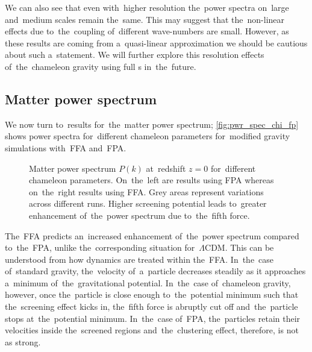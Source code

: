 We can also see that even with~higher resolution the~power spectra on~large and~medium scales remain the~same. This may suggest that the~non-linear effects due to~the~coupling of~different wave-numbers are small. However, as these results are coming from a~quasi-linear approximation we should be cautious about such a~statement. We will further explore this resolution effects of~the~chameleon gravity using full \nbodysim s in~the~future.
\subsection{Matter power spectrum}
We now turn to~results for~the~matter power spectrum; \autoref{fig:pwr_spec_chi_fp} shows power spectra for~different chameleon parameters for~modified gravity simulations with~FFA and~FPA.
\begin{figure}[bt]
	\begin{adjustwidth}{-1cm}{-1cm}
	\centering
		\begin{subfigure}{1.2\textwidth}
		\end{subfigure}
		\begin{subfigure}{0.5\textwidth}
		\end{subfigure}
		\begin{subfigure}{0.5\textwidth}
		\end{subfigure}
		\begin{subfigure}{0.5\textwidth}
		\end{subfigure}
		\begin{subfigure}{0.5\textwidth}
		\end{subfigure}
	\end{adjustwidth}
    \caption{Matter power spectrum $P(k)$ at~redshift $z=0$ for~different chameleon parameters. On~the~left are results using FPA whereas on~the~right results using FFA. Grey areas represent variations across different runs. Higher screening potential leads to~greater enhancement of~the~power spectrum due to~the~fifth force.}
    \label{fig:pwr_spec_chi_fp}
\end{figure}

The~FFA predicts an~increased enhancement of~the~power spectrum compared to~the~FPA, unlike the~corresponding situation for~$\Lambda$CDM. This can be understood from how dynamics are treated within the~FFA. In~the~case of~standard gravity, the~velocity of~a~particle decreases steadily as it approaches a~minimum of~the~gravitational potential. In~the~case of~chameleon gravity, however, once the~particle is close enough to~the~potential minimum such that the~screening effect kicks in, the~fifth force is abruptly cut off and~the~particle stops at~the~potential minimum. In~the~case of~FPA, the~particles retain their velocities inside the~screened regions and~the~clustering effect, therefore, is not as strong.

